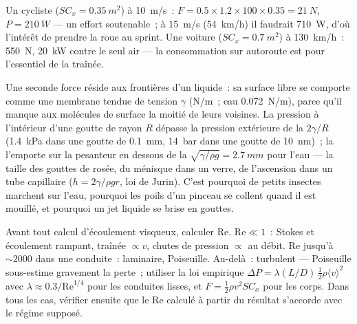 \begin{example}\label{ex:b2:viscous-flows:cyclist}
Un cycliste ($SC_x = \qty{0.35}{m^2}$) à \qty{10}{m/s}~: $F = 0.5 \times 1.2 \times 100
\times 0.35 = \qty{21}{N}$, $P = \qty{210}{W}$ --- un effort soutenable~; à \qty{15}{m/s}
(\qty{54}{km/h}) il faudrait \qty{710}{W}, d'où l'intérêt de prendre la roue au sprint.
Une voiture ($SC_x = \qty{0.7}{m^2}$) à \qty{130}{km/h}~: \qty{550}{N}, \qty{20}{kW} contre
le seul air --- la consommation sur autoroute est pour l'essentiel de la traînée.
\end{example}

\begin{remark}\label{rem:b2:viscous-flows:capillarity}
Une seconde force réside aux frontières d'un liquide~: sa surface libre
se comporte comme une membrane tendue de tension $\gamma$ (\unit{N/m}~; eau
\qty{0.072}{N/m}), parce qu'il manque aux molécules de surface la moitié de leurs voisines.
La pression à l'intérieur d'une goutte de rayon $R$ dépasse la pression extérieure de
la \emph{} $2\gamma/R$ (\qty{1.4}{kPa} dans une goutte de \qty{0.1}{mm},
\qty{14}{bar} dans une goutte de \qty{10}{nm})~; la  l'emporte sur la pesanteur en dessous de
la \emph{} $\sqrt{\gamma/\rho g} = \qty{2.7}{mm}$ pour l'eau ---
la taille des gouttes de rosée, du ménisque dans un verre, de l'ascension dans un
tube capillaire ($h = 2\gamma/\rho gr$, loi de Jurin). C'est pourquoi de petits insectes marchent
sur l'eau, pourquoi les poils d'un pinceau se collent quand il est mouillé, et pourquoi un
jet liquide se brise en gouttes.
\end{remark}

\begin{method}\label{met:b2:viscous-flows:regime}
Avant tout calcul d'écoulement visqueux, calculer $\mathrm{Re}$. $\mathrm{Re} \ll 1$~:
Stokes et écoulement rampant, traînée $\propto v$, chutes de pression $\propto$ au
débit. $\mathrm{Re}$ jusqu'à $\sim\!2000$ dans une conduite~: laminaire, Poiseuille. Au-delà~:
turbulent --- Poiseuille sous-estime gravement la perte~; utiliser la
loi empirique $\Delta P = \lambda(L/D)\,\tfrac12\rho\langle v\rangle^2$ avec $\lambda
\approx 0.3/\mathrm{Re}^{1/4}$ pour les conduites lisses, et $F = \tfrac12\rho v^2SC_x$ pour les
corps. Dans tous les cas, vérifier ensuite que le $\mathrm{Re}$ calculé
à partir du résultat s'accorde avec le régime supposé.
\end{method}


